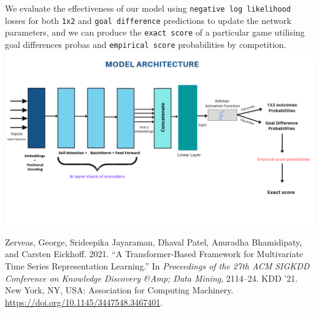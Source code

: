 \documentclass[
]{article}
\newlength{\cslhangindent}
\newlength{\cslentryspacingunit} %
\newenvironment{CSLReferences}[2] %
 {%
  \setlength{\parindent}{0pt}
  \ifodd #1
  \let\oldpar\par
  \def\par{\hangindent=\cslhangindent\oldpar}
  \fi
  \setlength{\parskip}{#2\cslentryspacingunit}
 }%
 {}
\begin{document}
We evaluate the effectiveness of our model using
\texttt{negative\ log\ likelihood} losses for both \texttt{1x2} and
\texttt{goal\ difference} predictions to update the network parameters,
and we can produce the \texttt{exact\ score} of a particular game
utilising goal differences probas and \texttt{empirical\ score}
probabilities by competition.
\includegraphics{figures/model_architecture.png}

\hypertarget{refs}{}
\begin{CSLReferences}{1}{0}
\leavevmode{}%
Zerveas, George, Srideepika Jayaraman, Dhaval Patel, Anuradha
Bhamidipaty, and Carsten Eickhoff. 2021. {``A Transformer-Based
Framework for Multivariate Time Series Representation Learning.''} In
\emph{Proceedings of the 27th ACM SIGKDD Conference on Knowledge
Discovery \&Amp; Data Mining}, 2114--24. KDD '21. New York, NY, USA:
Association for Computing Machinery.
\url{https://doi.org/10.1145/3447548.3467401}.

\end{CSLReferences}
\end{document}
